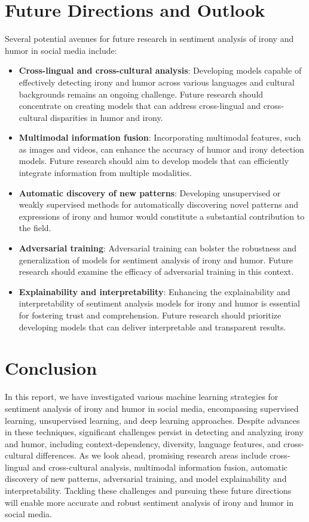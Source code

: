 \documentclass[a4paper]{article}
\begin{document}
\section{Future Directions and Outlook}
Several potential avenues for future research in sentiment analysis of irony and humor in social media include:

\begin{itemize}
\item \textbf{Cross-lingual and cross-cultural analysis}: Developing models capable of effectively detecting irony and humor across various languages and cultural backgrounds remains an ongoing challenge. Future research should concentrate on creating models that can address cross-lingual and cross-cultural disparities in humor and irony.
\item \textbf{Multimodal information fusion}: Incorporating multimodal features, such as images and videos, can enhance the accuracy of humor and irony detection models. Future research should aim to develop models that can efficiently integrate information from multiple modalities.
\item \textbf{Automatic discovery of new patterns}: Developing unsupervised or weakly supervised methods for automatically discovering novel patterns and expressions of irony and humor would constitute a substantial contribution to the field.
\item \textbf{Adversarial training}: Adversarial training can bolster the robustness and generalization of models for sentiment analysis of irony and humor. Future research should examine the efficacy of adversarial training in this context.
\item \textbf{Explainability and interpretability}: Enhancing the explainability and interpretability of sentiment analysis models for irony and humor is essential for fostering trust and comprehension. Future research should prioritize developing models that can deliver interpretable and transparent results.
\end{itemize}

\section{Conclusion}
In this report, we have investigated various machine learning strategies for sentiment analysis of irony and humor in social media, encompassing supervised learning, unsupervised learning, and deep learning approaches. Despite advances in these techniques, significant challenges persist in detecting and analyzing irony and humor, including context-dependency, diversity, language features, and cross-cultural differences. As we look ahead, promising research areas include cross-lingual and cross-cultural analysis, multimodal information fusion, automatic discovery of new patterns, adversarial training, and model explainability and interpretability. Tackling these challenges and pursuing these future directions will enable more accurate and robust sentiment analysis of irony and humor in social media.
\end{document}
